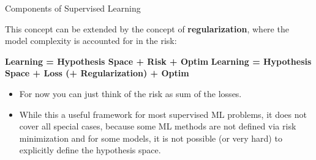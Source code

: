 \documentclass[11pt,compress,t,notes=noshow, xcolor=table]{beamer}
\begin{document}
\begin{vbframe}{Components of Supervised Learning}

This concept can be extended by the concept of \textbf{regularization}, where the model complexity is accounted for in the risk:

\lz


  \textbf{Learning = Hypothesis Space +  Risk + Optim }
  \textbf{Learning = Hypothesis Space + Loss (+ Regularization) + Optim}
  

\lz

\begin{itemize}

  \item For now you can just think of the risk as sum of the losses.
  
  \item While this a useful framework for most supervised ML problems, it does not cover all special cases, because some ML methods are not defined via risk minimization and for some models, it is not possible (or very hard) to explicitly define the hypothesis space.
  
\end{itemize}

\end{vbframe}

\end{document}

